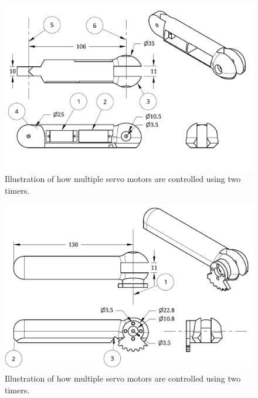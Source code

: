 \begin{figure}[H]
\centering
\includegraphics[scale = 0.8]{pics/DrawingB.pdf}
\caption{Illustration of how multiple servo motors are controlled using two timers.}
\label{fig:DrawingB}
\end{figure}

\begin{figure}[H]
\centering
\includegraphics[scale = 0.8]{pics/DrawingC.pdf}
\caption{Illustration of how multiple servo motors are controlled using two timers.}
\label{fig:DrawingC}
\end{figure}

